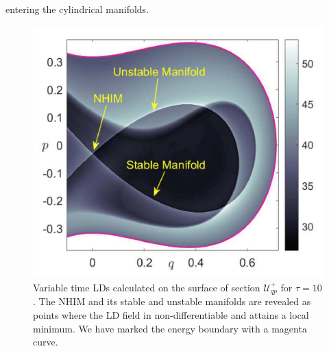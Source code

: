 \documentclass[8pt]{article}
\begin{document}
entering the cylindrical manifolds. 

\begin{figure}[!ht]
	\begin{center}		
	\includegraphics[scale=0.14]{fig11.png}
	\end{center}
	\caption{Variable time LDs calculated on the surface of section $\mathcal{U}^{+}_{qp}$ for $\tau = 10$. The NHIM and its stable and unstable manifolds are revealed as points where the LD field in non-differentiable and attains a local minimum. We have marked the energy boundary with a magenta curve.}
	\label{fig:LD_NHIM_detect}
\end{figure}
\end{document}
